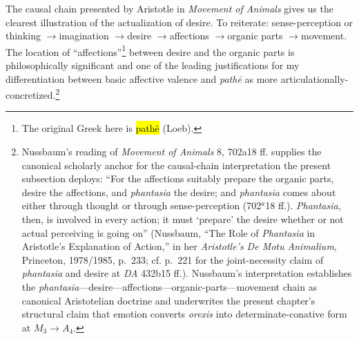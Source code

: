 \documentclass{article}
\newcommand{\ra}{\ensuremath{\rightarrow}}
\begin{document}
The causal chain presented by Aristotle in \textit{Movement of Animals} gives us the clearest illustration of the actualization of desire. To reiterate: sense-perception or thinking \ra imagination \ra desire \ra affections \ra organic parts \ra movement. The location of ``affections''\footnote{The original Greek here is \hl{pathē} (Loeb).} between desire and the organic parts is philosophically significant and one of the leading justifications for my differentiation between basic affective valence and \textit{pathē} as more articulationally-concretized.\footnote{Nussbaum's reading of \textit{Movement of Animals} 8, 702a18 ff. supplies the canonical scholarly anchor for the causal-chain interpretation the present subsection deploys: ``For the affections suitably prepare the organic parts, desire the affections, and \textit{phantasia} the desire; and \textit{phantasia} comes about either through thought or through sense-perception (702$^{a}$18 ff.). \textit{Phantasia}, then, is involved in every action; it must `prepare' the desire whether or not actual perceiving is going on'' (Nussbaum, ``The Role of \textit{Phantasia} in Aristotle's Explanation of Action,'' in her \textit{Aristotle's De Motu Animalium}, Princeton, 1978/1985, p.~233; cf. p.~221 for the joint-necessity claim of \textit{phantasia} and desire at \textit{DA} 432b15 ff.). Nussbaum's interpretation establishes the \textit{phantasia}---desire---affections---organic-parts---movement chain as canonical Aristotelian doctrine and underwrites the present chapter's structural claim that emotion converts \textit{orexis} into determinate-conative form at $M_3 \rightarrow A_4$.}
\end{document}
